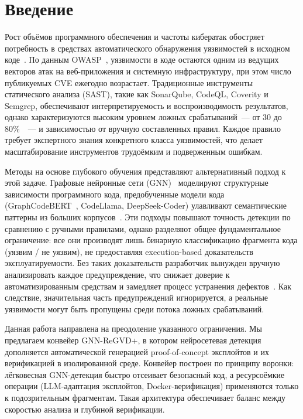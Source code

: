 \documentclass[runningheads]{llncs}
\begin{document}
\section{Введение}

Рост объёмов программного обеспечения и частоты кибератак обостряет потребность в средствах автоматического обнаружения уязвимостей в исходном коде~\cite{nist800}. По данным OWASP~\cite{owasp2024}, уязвимости в коде остаются одним из ведущих векторов атак на веб-приложения и системную инфраструктуру, при этом число публикуемых CVE ежегодно возрастает. Традиционные инструменты статического анализа (SAST), такие как SonarQube, CodeQL, Coverity и Semgrep, обеспечивают интерпретируемость и воспроизводимость результатов, однако характеризуются высоким уровнем ложных срабатываний~--- от 30 до 80\%~\cite{sultana2024}~--- и зависимостью от вручную составленных правил. Каждое правило требует экспертного знания конкретного класса уязвимостей, что делает масштабирование инструментов трудоёмким и подверженным ошибкам.

Методы на основе глубокого обучения представляют альтернативный подход к этой задаче. Графовые нейронные сети (GNN)~\cite{nguyen2022regvd,zhou2019devign} моделируют структурные зависимости программного кода, предобученные модели кода (GraphCodeBERT~\cite{guo2021graphcodebert}, CodeLlama, DeepSeek-Coder) улавливают семантические паттерны из больших корпусов~\cite{ding2024}. Эти подходы повышают точность детекции по сравнению с ручными правилами, однако разделяют общее фундаментальное ограничение: все они производят лишь бинарную классификацию фрагмента кода (уязвим / не уязвим), не предоставляя execution-based доказательств эксплуатируемости. Без таких доказательств разработчик вынужден вручную анализировать каждое предупреждение, что снижает доверие к автоматизированным средствам и замедляет процесс устранения дефектов~\cite{gajjar2026vbf}. Как следствие, значительная часть предупреждений игнорируется, а реальные уязвимости могут быть пропущены среди потока ложных срабатываний.

Данная работа направлена на преодоление указанного ограничения. Мы предлагаем конвейер GNN-ReGVD+, в котором нейросетевая детекция дополняется автоматической генерацией proof-of-concept эксплойтов и их верификацией в изолированной среде. Конвейер построен по принципу воронки: лёгковесная GNN-детекция быстро отсеивает безопасный код, а ресурсоёмкие операции (LLM-адаптация эксплойтов, Docker-верификация) применяются только к подозрительным фрагментам. Такая архитектура обеспечивает баланс между скоростью анализа и глубиной верификации.
\end{document}
